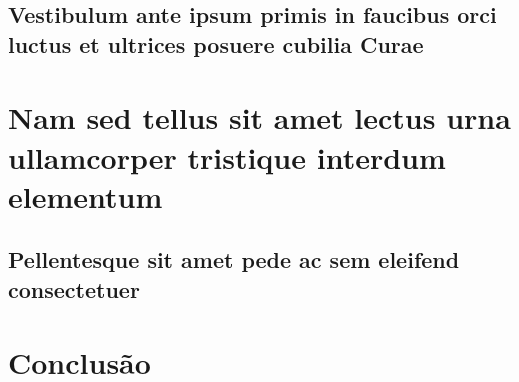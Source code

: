 \documentclass[
	12pt,				%
	openright,			%
	twoside,			%
	a4paper,			%
	english,			%
	brazil,				%
	]{abntex2}
\begin{document}
\section{Vestibulum ante ipsum primis in faucibus orci luctus et ultrices
posuere cubilia Curae}

\lipsum[21-22]

\chapter{Nam sed tellus sit amet lectus urna ullamcorper tristique interdum
elementum}

\section{Pellentesque sit amet pede ac sem eleifend consectetuer}

\lipsum[24]

% 

\chapter*[Conclusão]{Conclusão}

\lipsum[31-33]

\postextual


%


%
%

\end{document}
